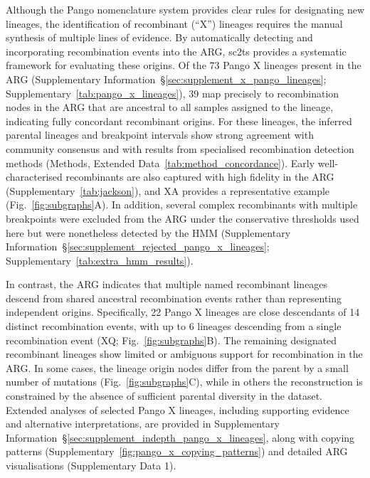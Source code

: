 \documentclass[12pt]{article}
\newcommand{\supref}[1]{Supplementary Information~\S\ref{#1}}
\newcommand{\figref}[1]{Fig.~\ref{#1}}
\newcommand{\edref}[1]{Extended Data~\ref{#1}}
\newcommand{\siref}[1]{Supplementary~\ref{#1}}
\begin{document}
Although the Pango nomenclature system\cite{Rambaut2020} provides clear
rules for designating new lineages, the identification of
recombinant (``X'') lineages requires the manual synthesis
of multiple lines of evidence\cite{Smith2023tracking}.
By automatically detecting and incorporating recombination events into the ARG,
sc2ts provides a systematic framework for evaluating these origins.
Of the 73 Pango X lineages present in the ARG
(\supref{sec:supplement_x_pango_lineages};
\siref{tab:pango_x_lineages}),
39 map precisely to
recombination nodes in the ARG that are ancestral to all samples assigned to
the lineage, indicating fully concordant recombinant origins.
For these
lineages, the inferred parental lineages and breakpoint intervals show strong
agreement with community consensus and with results from specialised
recombination detection methods
(Methods, \edref{tab:method_concordance}).
Early well-characterised recombinants\cite{Jackson2021} are also captured
with high fidelity in the ARG
(\siref{tab:jackson}),
and XA provides a representative example (\figref{fig:subgraphs}A).
In addition, several complex recombinants with multiple
breakpoints were excluded from the ARG under the conservative thresholds used
here but were nonetheless detected by the HMM
(\supref{sec:supplement_rejected_pango_x_lineages};
\siref{tab:extra_hmm_results}).

In contrast, the ARG indicates that multiple named recombinant lineages descend
from shared ancestral recombination events rather than representing independent
origins.
Specifically, 22 Pango X lineages are close descendants of 14 distinct
recombination events, with up to 6 lineages descending from a
single recombination event (XQ; \figref{fig:subgraphs}B).
The remaining designated recombinant lineages show limited or ambiguous support for
recombination in the ARG. In some cases, the lineage origin nodes differ from the
parent by a small number of mutations (\figref{fig:subgraphs}C),
while in others
the reconstruction is constrained by the absence of sufficient parental
diversity in the dataset. Extended analyses of selected Pango X lineages, including
supporting evidence and alternative interpretations, are provided in
\supref{sec:supplement_indepth_pango_x_lineages},
along with copying patterns (\siref{fig:pango_x_copying_patterns})
and detailed ARG visualisations (Supplementary Data 1).
\end{document}
